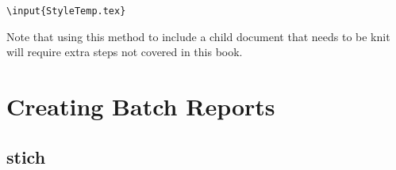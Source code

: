 \begin{knitrout}
\color{fgcolor}\begin{kframe}
\begin{alltt}
\textbackslash{}input\{StyleTemp.tex\}
\end{alltt}
\end{kframe}
\end{knitrout}


\noindent Note that using this method to include a child document that needs to be knit will require extra steps not covered in this book.


\section{Creating Batch Reports}

\subsection{stich}
